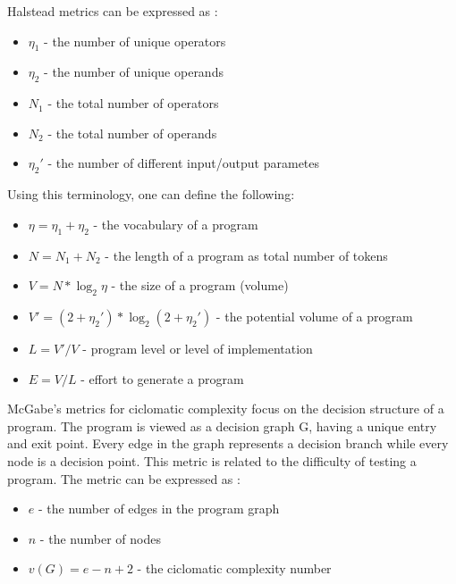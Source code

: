 \documentclass{article}
\begin{document}
Halstead metrics can be expressed as :

\begin{itemize}
\item $\eta_1$ - the number of unique operators \par
\item $\eta_2$ - the number of unique operands \par
\item $N_1$ - the total number of operators \par
\item$N_2$ - the total number of operands \par
\item$\eta_2'$ - the number of different input/output parametes \par
\end{itemize}

Using this terminology, one can define the following:\par
\begin{itemize}
\item $\eta = \eta_1 + \eta_2 $ - the vocabulary of a program \par
\item $N = N_1 + N_2 $ - the length of a program as total number of tokens \par
\item $V = N * \log _2 \eta $ - the size of a program (volume) \par
\item $V' = (2 + \eta_2')*\log_2(2 + \eta_2')$ - the potential volume of a program \par
\item $L = V' / V $ - program level or level of implementation \par
\item $E = V / L $ - effort to generate a program
\end{itemize}

McGabe's metrics for ciclomatic complexity focus on the decision structure of a program. The program is viewed as a decision graph G, having a unique entry and exit point. Every edge in the graph represents a decision branch while every node is a decision point. This metric is related to the difficulty of testing a program. The metric can be expressed as :
\begin{itemize}
\item $e$ - the number of edges in the program graph \par
\item $n$ - the number of nodes \par
\item $v(G) = e - n + 2$ - the ciclomatic complexity number
\end{itemize}
\end{document}
